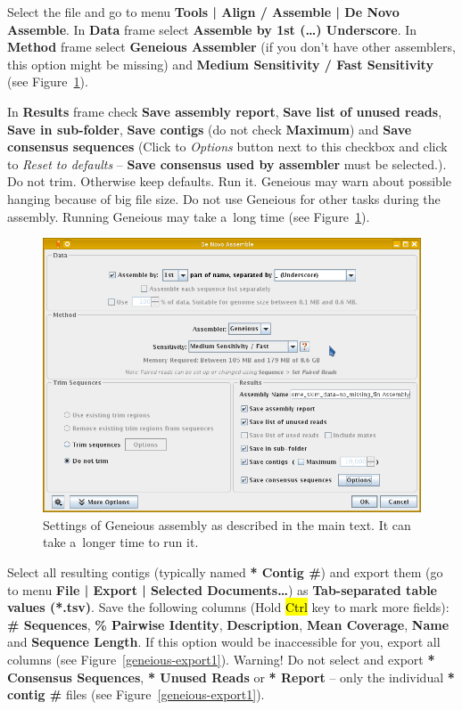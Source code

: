 \documentclass[a4paper, 11pt, twoside]{article}
\renewcommand{\texttt}[1]{\hl{\ttfamily #1}}
\begin{document}
Select the file and go to menu \textbf{Tools | Align / Assemble | De Novo Assemble}. In \textbf{Data} frame select \textbf{Assemble by 1st (\ldots) Underscore}. In \textbf{Method} frame select \textbf{Geneious Assembler} (if you don't have other assemblers, this option might be missing) and \textbf{Medium Sensitivity / Fast Sensitivity} (see Figure~\ref{geneious-assembly}).

In \textbf{Results} frame check \textbf{Save assembly report}, \textbf{Save list of unused reads}, \textbf{Save in sub-folder}, \textbf{Save contigs} (do not check \textbf{Maximum}) and \textbf{Save consensus sequences} (Click to \textit{Options} button next to this checkbox and click to \textit{Reset to defaults} -- \textbf{Save consensus used by assembler} must be selected.). Do not trim. Otherwise keep defaults. Run it. Geneious may warn about possible hanging because of big file size. Do not use Geneious for other tasks during the assembly. Running Geneious may take a~long time (see Figure~\ref{geneious-assembly}).

\begin{figure}[htb]
  \begin{center}
    \includegraphics[width=12cm]{geneious2.png}
  \end{center}
  \caption[Settings of Geneious assembly]{Settings of Geneious assembly as described in the main text. It can take a~longer time to run it.}
  \label{geneious-assembly}
\end{figure}

Select all resulting contigs (typically named \textbf{* Contig \#}) and export them (go to menu \textbf{File | Export | Selected Documents\ldots}) as \textbf{Tab-separated table values (*.tsv)}. Save the following columns (Hold \texttt{Ctrl} key to mark more fields): \textbf{\# Sequences}, \textbf{\% Pairwise Identity}, \textbf{Description}, \textbf{Mean Coverage}, \textbf{Name} and \textbf{Sequence Length}. If this option would be inaccessible for you, export all columns (see Figure~\ref{geneious-export1}). Warning! Do not select and export \textbf{* Consensus Sequences}, \textbf{* Unused Reads} or \textbf{* Report} -- only the individual \textbf{* contig \#} files (see Figure~\ref{geneious-export1}).
\end{document}
